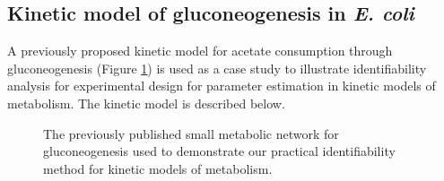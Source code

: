 \documentclass[10pt]{article}
\begin{document}
	
	
		
	\subsection{Kinetic model of gluconeogenesis in \textit{E. coli}}\label{sec:small-model}
	A previously proposed kinetic model \parencite{Kotte2014, Srinivasan2017} for acetate consumption through gluconeogenesis (Figure \ref{fig:network}) is used as a case study to illustrate identifiability analysis for experimental design for parameter estimation in kinetic models of metabolism. The kinetic model is described below.
	
	\begin{figure}[!tbhp]
		\caption{The previously published small metabolic network for gluconeogenesis used to demonstrate our practical identifiability method for kinetic models of metabolism.}\label{fig:network}
	\end{figure}		
	
\end{document}
